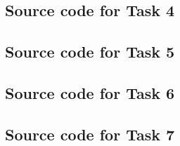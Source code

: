 \documentclass[11pt]{article}
\begin{document}
\subsection{Source code for Task 4}

\newpage
\subsection{Source code for Task 5}

\subsection{Source code for Task 6}

\newpage
\subsection{Source code for Task 7}

\end{document}
